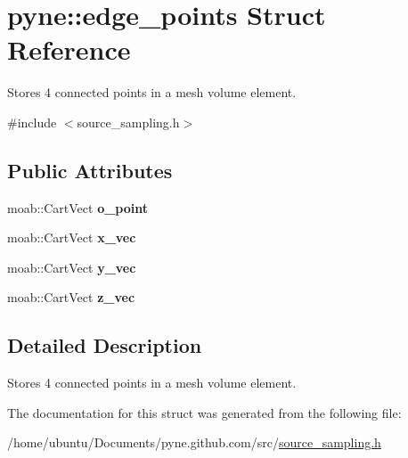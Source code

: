 \hypertarget{structpyne_1_1edge__points}{}\section{pyne\+:\+:edge\+\_\+points Struct Reference}
\label{structpyne_1_1edge__points}


Stores 4 connected points in a mesh volume element.  




{\ttfamily \#include $<$source\+\_\+sampling.\+h$>$}

\subsection*{Public Attributes}
\begin{DoxyCompactItemize}
\item 
moab\+::\+Cart\+Vect {\bfseries o\+\_\+point}\hypertarget{structpyne_1_1edge__points_ada309b6576a990d7e911fb31ee450d64}{}\label{structpyne_1_1edge__points_ada309b6576a990d7e911fb31ee450d64}

\item 
moab\+::\+Cart\+Vect {\bfseries x\+\_\+vec}\hypertarget{structpyne_1_1edge__points_ace3786aead7c2cbce033bd48c84df18b}{}\label{structpyne_1_1edge__points_ace3786aead7c2cbce033bd48c84df18b}

\item 
moab\+::\+Cart\+Vect {\bfseries y\+\_\+vec}\hypertarget{structpyne_1_1edge__points_a5a7e7f46555011e67e5b55c0a8af20f1}{}\label{structpyne_1_1edge__points_a5a7e7f46555011e67e5b55c0a8af20f1}

\item 
moab\+::\+Cart\+Vect {\bfseries z\+\_\+vec}\hypertarget{structpyne_1_1edge__points_a63554c3a4e3b789665d686dc9af79f85}{}\label{structpyne_1_1edge__points_a63554c3a4e3b789665d686dc9af79f85}

\end{DoxyCompactItemize}


\subsection{Detailed Description}
Stores 4 connected points in a mesh volume element. 

The documentation for this struct was generated from the following file\+:\begin{DoxyCompactItemize}
\item 
/home/ubuntu/\+Documents/pyne.\+github.\+com/src/\hyperlink{source__sampling_8h}{source\+\_\+sampling.\+h}\end{DoxyCompactItemize}

